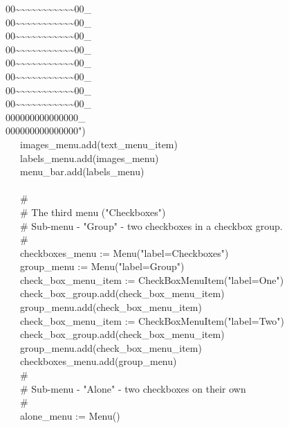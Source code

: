 {00\~{}\~{}\~{}\~{}\~{}\~{}\~{}\~{}\~{}\~{}\~{}00\_ \\
00\~{}\~{}\~{}\~{}\~{}\~{}\~{}\~{}\~{}\~{}\~{}00\_ \\
00\~{}\~{}\~{}\~{}\~{}\~{}\~{}\~{}\~{}\~{}\~{}00\_ \\
00\~{}\~{}\~{}\~{}\~{}\~{}\~{}\~{}\~{}\~{}\~{}00\_ \\
00\~{}\~{}\~{}\~{}\~{}\~{}\~{}\~{}\~{}\~{}\~{}00\_ \\
00\~{}\~{}\~{}\~{}\~{}\~{}\~{}\~{}\~{}\~{}\~{}00\_ \\
00\~{}\~{}\~{}\~{}\~{}\~{}\~{}\~{}\~{}\~{}\~{}00\_ \\
00\~{}\~{}\~{}\~{}\~{}\~{}\~{}\~{}\~{}\~{}\~{}00\_ \\
000000000000000\_ \\
000000000000000") \\
\>   \ \ \ images\_menu.add(text\_menu\_item) \\
\>   \ \ \ labels\_menu.add(images\_menu) \\
\>   \ \ \ menu\_bar.add(labels\_menu) \\
\ \\
\>   \ \ \ \# \\
\>   \ \ \ \# The third menu
("Checkboxes") \\
\>   \ \ \ \# Sub-menu - "Group" - two
checkboxes in a checkbox group. \\
\>   \ \ \ \# \\
\>   \ \ \ checkboxes\_menu :=
Menu("label=Checkboxes") \\
\>   \ \ \ group\_menu :=
Menu("label=Group") \\
\>   \ \ \ check\_box\_menu\_item :=
CheckBoxMenuItem("label=One") \\
\>   \ \ \ check\_box\_group.add(check\_box\_menu\_item) \\
\>   \ \ \ group\_menu.add(check\_box\_menu\_item) \\
\>   \ \ \ check\_box\_menu\_item :=
CheckBoxMenuItem("label=Two") \\
\>   \ \ \ check\_box\_group.add(check\_box\_menu\_item) \\
\>   \ \ \ group\_menu.add(check\_box\_menu\_item) \\
\>   \ \ \ checkboxes\_menu.add(group\_menu) \\
\>   \ \ \ \# \\
\>   \ \ \ \# Sub-menu - "Alone" - two
checkboxes on their own \\
\>   \ \ \ \# \\
\>   \ \ \ alone\_menu := Menu() \\
}
